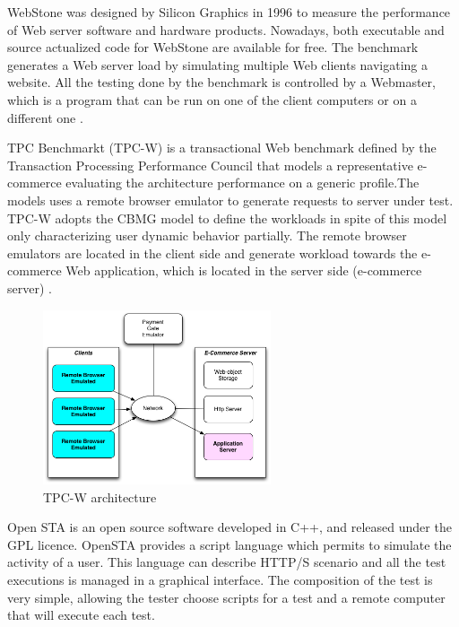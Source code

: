 \documentclass{report}
\begin{document}
WebStone was designed by Silicon Graphics in 1996 to measure the performance of Web server software and hardware products. Nowadays, both executable and source actualized code for WebStone are available for free. The benchmark generates a Web server load by simulating multiple Web clients navigating a website. All the testing done by the benchmark is controlled by a Webmaster, which is a program that can be run on one of the client computers or on a different one \cite{MohammadS.Obaidat} \cite{Trent1995} .

TPC Benchmarkt (TPC-W) is a transactional Web benchmark defined by the Transaction Processing Performance Council that models a representative e-commerce evaluating the architecture performance on a generic profile.The models uses a remote browser emulator to generate requests to server under test. TPC-W adopts the CBMG model to define the workloads in spite of this model only characterizing user dynamic behavior partially. The remote browser emulators are located in the client side and generate workload towards the e-commerce Web application, which is located in the server side (e-commerce server) \cite{MohammadS.Obaidat} \cite{Menasce2002a}.

\begin{figure}[h]
\centering
\includegraphics[width=0.6\textwidth]{./images/tpcw.png}
\caption{TPC-W architecture \cite{MohammadS.Obaidat} \cite{Menasce2002a}}
\label{fig:tpcw}
\end{figure}


Open STA is an open source software developed in C++, and released under the GPL licence. OpenSTA provides a script language which permits to simulate the activity of a user. This language can describe HTTP/S scenario and all the test executions is managed in a graphical interface. The composition of the test is
very simple, allowing the tester choose scripts for a test and a remote computer that will execute each test.
\end{document}
